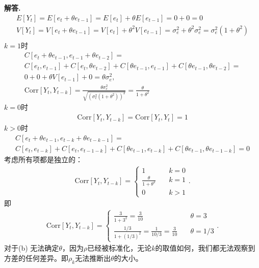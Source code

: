 \documentclass[12pt, a4paper, oneside]{ctexart}
\newenvironment{solution}{\par\noindent\textbf{解答. }}{\par}
\begin{document}
\begin{solution}
    \begin{gather*}
        E[Y_t] = E[e_t+\theta e_{t-1}] = E[e_t] + \theta E[e_{t-1}] = 0 + 0 = 0\\
        V[Y_t] = V[e_t + \theta e_{t-1}] =  V[e_t] + \theta^2 V[e_{t-1}] = \sigma_e^2 + \theta^2 \sigma_e^2 = \sigma_e^2(1 + \theta^2)\\
    \end{gather*}
    $k=1$时
    \begin{gather*}
        C[e_t + \theta e_{t-1}, e_{t-1} + \theta e_{t-2}] = \\
        C[e_t,e_{t-1}] + C[e_t, \theta e_{t-2}] + C[\theta e_{t-1}, e_{t-1}] + C[\theta e_{t-1}, \theta e_{t-2}] = \\
        0 + 0 + \theta V[e_{t-1}] + 0 = \theta \sigma_e^2,\\
        \text{Corr}[Y_t, Y_{t-k}] = \frac{\theta \sigma_e^2}{\sqrt{(\sigma_e^2(1+\theta^2))^2}} = \frac{\theta }{1+\theta^2}
      \end{gather*}
      $k=0$时
      \begin{gather*}
        \text{Corr}[Y_t, Y_{t-k}] = \text{Corr}[Y_t, Y_t] = 1
      \end{gather*}
      $k>0$时
      \begin{gather*}
        C[e_t + \theta e_{t-1}, e_{t-k} + \theta e_{t-k-1}] = \\
        C[e_t, e_{t-k}] + C[e_t, e_{t-1-k}] + C[\theta e_{t-1}, e_{t-k}] + C[\theta e_{t-1}, \theta e_{t-1-k}] = 0
      \end{gather*}
      考虑所有项都是独立的：
      \begin{gather*} \text{Corr}[Y_t, Y_{t-k}] =
        \begin{cases}
          1                            & \quad  k = 0\\
          \frac{\theta}{1 + \theta^2}  & \quad  k = 1\\
          0                            & \quad  k > 1
        \end{cases}.
      \end{gather*}
      即
      \begin{gather*}
        \text{Corr}[Y_t, Y_{t-k}] =
        \begin{cases}
          \frac{3}{1+3^2} = \frac{3}{10} & \quad \theta = 3\\
          \frac{1/3}{1 + (1/3)^2} = \frac{1}{10/3} = \frac{3}{10}  & \quad \theta = 1/3
        \end{cases}.
      \end{gather*}
      对于(b)
      无法确定$\theta$，因为$\rho$已经被标准化，无论$k$的取值如何，我们都无法观察到方差的任何差异。即$\rho_k$无法推断出$\theta$的大小。
\end{solution}
\end{document}
